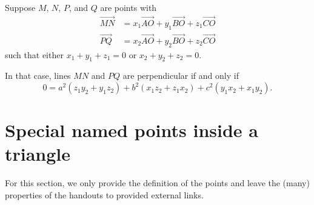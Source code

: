 \documentclass[11pt]{scrartcl}
\begin{document}
\begin{theorem}
   Suppose $M$, $N$, $P$, and $Q$ are points with
   \begin{align*}
      \overrightarrow{MN} &= x_1 \overrightarrow{AO} + y_1 \overrightarrow{BO} + z_1 \overrightarrow{CO} \\
      \overrightarrow{PQ} &= x_2 \overrightarrow{AO} + y_2 \overrightarrow{BO} + z_2 \overrightarrow{CO}
   \end{align*}
   such that either $x_1+y_1+z_1=0$ or $x_2+y_2+z_2=0$.

   In that case, lines $MN$ and $PQ$ are perpendicular if and only if
   \[  0 = a^2(z_1y_2 + y_1z_2) + b^2(x_1z_2 + z_1x_2) + c^2(y_1x_2 + x_1y_2). \]
\end{theorem}


\section{Special named points inside a triangle}
For this section, we only provide the definition of the points
and leave the (many) properties of the handouts to provided external links.
\end{document}
